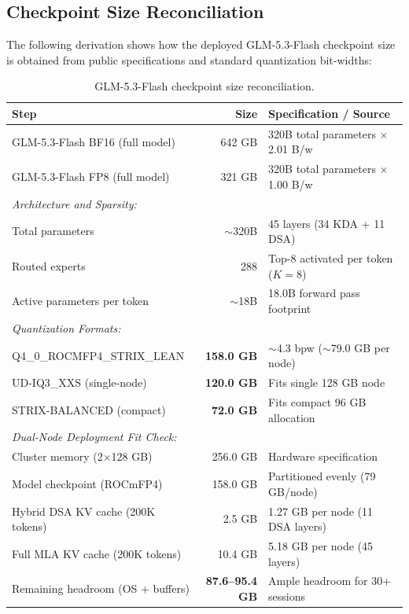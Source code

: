\documentclass[11pt,a4paper]{article}
\begin{document}
\subsection{Checkpoint Size Reconciliation}
The following derivation shows how the deployed GLM-5.3-Flash checkpoint size is obtained from public specifications and standard quantization bit-widths:

\begin{table}[ht!]
\centering
\caption{GLM-5.3-Flash checkpoint size reconciliation.}
\vspace{0.2cm}
\begin{tabular}{p{5.5cm} r l}
\toprule
\textbf{Step} & \textbf{Size} & \textbf{Specification / Source} \\
\midrule
GLM-5.3-Flash BF16 (full model) & 642 GB & 320B total parameters $\times$ 2.01 B/w \\
GLM-5.3-Flash FP8 (full model) & 321 GB & 320B total parameters $\times$ 1.00 B/w \\
\midrule
\multicolumn{3}{l}{\textit{Architecture and Sparsity:}} \\
Total parameters & $\sim$320B & 45 layers (34 KDA + 11 DSA) \\
Routed experts & 288 & Top-8 activated per token ($K=8$) \\
Active parameters per token & $\sim$18B & 18.0B forward pass footprint \\
\midrule
\multicolumn{3}{l}{\textit{Quantization Formats:}} \\
Q4\_0\_ROCMFP4\_STRIX\_LEAN & \textbf{158.0 GB} & $\sim$4.3 bpw ($\sim$79.0 GB per node) \\
UD-IQ3\_XXS (single-node) & \textbf{120.0 GB} & Fits single 128 GB node \\
STRIX-BALANCED (compact) & \textbf{72.0 GB} & Fits compact 96 GB allocation \\
\midrule
\multicolumn{3}{l}{\textit{Dual-Node Deployment Fit Check:}} \\
Cluster memory (2$\times$128 GB) & 256.0 GB & Hardware specification \\
Model checkpoint (ROCmFP4) & 158.0 GB & Partitioned evenly (79 GB/node) \\
Hybrid DSA KV cache (200K tokens) & 2.5 GB & 1.27 GB per node (11 DSA layers) \\
Full MLA KV cache (200K tokens) & 10.4 GB & 5.18 GB per node (45 layers) \\
Remaining headroom (OS + buffers) & \textbf{87.6--95.4 GB} & Ample headroom for 30+ sessions \\
\bottomrule
\end{tabular}
\label{tab:size_reconciliation}
\end{table}
\end{document}
